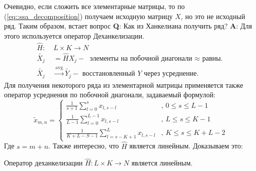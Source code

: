 Очевидно, если сложить все элементарные матрицы, то по (\ref{eq::ssa_decomposition}) получаем исходную матрицу $X$, но это не исходный ряд. Таким образом, встает вопрос \textbf{Q}:  Как из Ханкелиана получить ряд? \textbf{A}: Для этого используется оператор Деханкелизации. 
\begin{equation}
	\begin{split}
		\hat{H}: \; & L\times K \rightarrow N\\
		\tilde{X_j} & = \hat{H}X_j - \text{ элементы на побочной диагонали $\approx$ равны.}\\
		\tilde{X_j} & \stackrel{\text{avg}}{\rightarrow} \tilde{Y_j} - \text{ восстановленный $Y$ через усреднение.}
	\end{split}
\end{equation}
Для получения некоторого ряда из элементарной матрицы применяется также оператор усреднения по побочной диагонали, задаваемый формулой:
\begin{equation} \label{eq::dehankelisation}
	\tilde{x}_{m,n} = 
	\left\{\begin{array}{ll}
		\displaystyle
		\frac{1}{s + 1} \sum_{l = 0}^s x_{l, s - l} & \text{, } 0 \le s \le L - 1\\
		\displaystyle
		\frac{1}{L - 1} \sum_{l = 0}^{L - 1} x_{l, s - l} & \text{, } L \le s \le K - 1\\
		\displaystyle
		\frac{1}{K + L - S - 1} \sum_{l = s - K + 1}^L x_{l, s- l} & \text{, } K \le s \le K + L - 2
	\end{array}\right.
\end{equation}
\noindent Где $s = m + n$. Также интересно, что  $\hat{H}$ является линейным. Доказываем это:
\begin{lemma}
	Оператор деханкелизации $\hat{H}: L \times K \to N$ является линейным.
\end{lemma}

